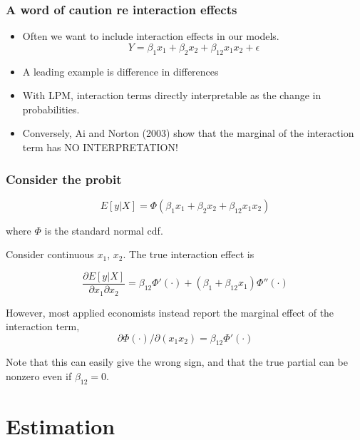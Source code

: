 \documentclass[11pt,dvipsnames,table,aspectratio=169]{beamer}
\begin{document}
\begin{frame}
       \frametitle{A word of caution re interaction effects}
       \begin{itemize}
       \item Often we want to include interaction effects in our models. 
       $$ Y = \beta_1 x_1 + \beta_2 x_2 + \beta_{12}x_1x_2 + \epsilon $$ 
       \item A leading example is difference in differences 
       \item With LPM, interaction terms directly interpretable as the change in probabilities. 
       \item Conversely, Ai and Norton (2003) show that the marginal of the interaction term has NO INTERPRETATION!
       \end{itemize}
\end{frame}



\begin{frame}
       \frametitle{Consider the probit}

       $$E[y|X] = \Phi(\beta_1 x_1 + \beta_2 x_2 + \beta_{12}x_1x_2) $$ 

       where $\Phi$ is the standard normal cdf. 

       \medskip

       Consider continuous $x_1$, $x_2$. The true interaction effect is 

       $$ \frac{\partial E[y|X]}{\partial x_1 \partial x_2} = 
              \beta_{12}\Phi'(\cdot) + (\beta_1 + \beta_{12}x_1)\Phi''(\cdot) $$ 

       \pause 
       However, most applied economists instead report the marginal effect of the interaction term, 
       $$\partial \Phi (\cdot)/ \partial (x_1 x_2) = \beta_{12} \Phi'(\cdot) $$

       Note that this can easily give the wrong sign, and that the true partial can be nonzero even if $\beta_{12} = 0$. 

\end{frame}


\section{Estimation}
\end{document}
